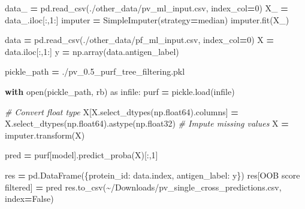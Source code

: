 \documentclass[
  11pt,
  oneside]{book}
\newenvironment{Shaded}{\begin{snugshade}}{\end{snugshade}}
\newcommand{\BuiltInTok}[1]{#1}
\newcommand{\CommentTok}[1]{\textcolor[rgb]{0.56,0.35,0.01}{\textit{#1}}}
\newcommand{\ControlFlowTok}[1]{\textcolor[rgb]{0.13,0.29,0.53}{\textbf{#1}}}
\newcommand{\DecValTok}[1]{\textcolor[rgb]{0.00,0.00,0.81}{#1}}
\newcommand{\ImportTok}[1]{#1}
\newcommand{\NormalTok}[1]{#1}
\newcommand{\OperatorTok}[1]{\textcolor[rgb]{0.81,0.36,0.00}{\textbf{#1}}}
\newcommand{\StringTok}[1]{\textcolor[rgb]{0.31,0.60,0.02}{#1}}
\newcommand{\VariableTok}[1]{\textcolor[rgb]{0.00,0.00,0.00}{#1}}
\begin{document}
\begin{Shaded}
\begin{Highlighting}[]
\NormalTok{data\_ }\OperatorTok{=}\NormalTok{ pd.read\_csv(}\StringTok{\textquotesingle{}./other\_data/pv\_ml\_input.csv\textquotesingle{}}\NormalTok{, index\_col}\OperatorTok{=}\DecValTok{0}\NormalTok{)}
\NormalTok{X\_ }\OperatorTok{=}\NormalTok{ data\_.iloc[:,}\DecValTok{1}\NormalTok{:]}
\NormalTok{imputer }\OperatorTok{=}\NormalTok{ SimpleImputer(strategy}\OperatorTok{=}\StringTok{\textquotesingle{}median\textquotesingle{}}\NormalTok{)}
\NormalTok{imputer.fit(X\_)}

\NormalTok{data }\OperatorTok{=}\NormalTok{ pd.read\_csv(}\StringTok{\textquotesingle{}./other\_data/pf\_ml\_input.csv\textquotesingle{}}\NormalTok{, index\_col}\OperatorTok{=}\DecValTok{0}\NormalTok{)}
\NormalTok{X }\OperatorTok{=}\NormalTok{ data.iloc[:,}\DecValTok{1}\NormalTok{:]}
\NormalTok{y }\OperatorTok{=}\NormalTok{ np.array(data.antigen\_label)}

\NormalTok{pickle\_path }\OperatorTok{=} \StringTok{\textquotesingle{}./pv\_0.5\_purf\_tree\_filtering.pkl\textquotesingle{}}

\ControlFlowTok{with} \BuiltInTok{open}\NormalTok{(pickle\_path, }\StringTok{\textquotesingle{}rb\textquotesingle{}}\NormalTok{) }\ImportTok{as}\NormalTok{ infile:}
\NormalTok{    purf }\OperatorTok{=}\NormalTok{ pickle.load(infile)}

\CommentTok{\# Convert float type}
\NormalTok{X[X.select\_dtypes(np.float64).columns] }\OperatorTok{=}\NormalTok{ X.select\_dtypes(np.float64).astype(np.float32)}
\CommentTok{\# Impute missing values}
\NormalTok{X }\OperatorTok{=}\NormalTok{ imputer.transform(X)}

\NormalTok{pred }\OperatorTok{=}\NormalTok{ purf[}\StringTok{\textquotesingle{}model\textquotesingle{}}\NormalTok{].predict\_proba(X)[:,}\DecValTok{1}\NormalTok{]}

\NormalTok{res }\OperatorTok{=}\NormalTok{ pd.DataFrame(\{}\StringTok{\textquotesingle{}protein\_id\textquotesingle{}}\NormalTok{: data.index, }\StringTok{\textquotesingle{}antigen\_label\textquotesingle{}}\NormalTok{: y\})}
\NormalTok{res[}\StringTok{\textquotesingle{}OOB score filtered\textquotesingle{}}\NormalTok{] }\OperatorTok{=}\NormalTok{ pred}
\NormalTok{res.to\_csv(}\StringTok{\textquotesingle{}\textasciitilde{}/Downloads/pv\_single\_cross\_predictions.csv\textquotesingle{}}\NormalTok{, index}\OperatorTok{=}\VariableTok{False}\NormalTok{)}
\end{Highlighting}
\end{Shaded}
\end{document}
